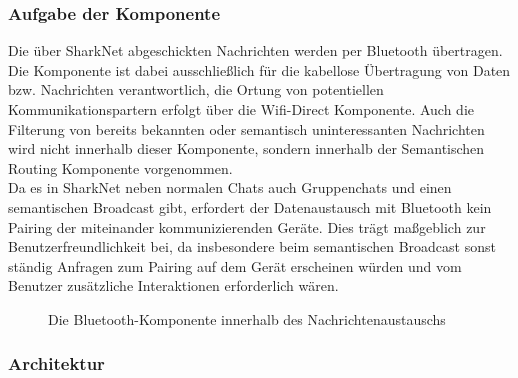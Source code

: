 

\subsubsection{Aufgabe der Komponente}
Die über SharkNet abgeschickten Nachrichten werden per Bluetooth übertragen. Die Komponente ist dabei ausschließlich für die kabellose Übertragung von Daten bzw. Nachrichten verantwortlich, die Ortung von potentiellen Kommunikationspartern erfolgt über die Wifi-Direct Komponente. Auch die Filterung von bereits bekannten oder semantisch uninteressanten Nachrichten wird nicht innerhalb dieser Komponente, sondern innerhalb der Semantischen Routing Komponente vorgenommen.
\\Da es in SharkNet neben normalen Chats auch Gruppenchats und einen semantischen Broadcast gibt, erfordert der Datenaustausch mit Bluetooth kein Pairing der miteinander kommunizierenden Geräte. Dies trägt maßgeblich zur Benutzerfreundlichkeit bei, da insbesondere beim semantischen Broadcast sonst ständig Anfragen zum Pairing auf dem Gerät erscheinen würden und vom Benutzer zusätzliche Interaktionen erforderlich wären.\newline
\begin{figure}[H]
	\centering
	\caption{Die Bluetooth-Komponente innerhalb des Nachrichtenaustauschs}
	\label{fig:bluetoothComp}
\end{figure}
\newpage
\subsubsection{Architektur}
\label{ch:bluetoothoverview}


